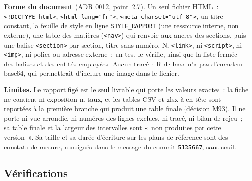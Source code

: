 \documentclass[a4paper,11pt]{article}
\newcommand{\code}[1]{\texttt{\small #1}}
\begin{document}
\medskip
\noindent
\textbf{Forme du document} (ADR 0012, point~2.7). Un seul fichier HTML~:
\code{<!DOCTYPE html>}, \code{<html lang="fr">},
\code{<meta charset="utf-8">}, un titre constant, la feuille de style en
ligne \code{STYLE\_RAPPORT} (une ressource interne, non externe), une table
des matières (\code{<nav>}) qui renvoie aux ancres des sections, puis une
balise \code{<section>} par section, titre sans numéro. Ni \code{<link>}, ni
\code{<script>}, ni \code{<img>}, ni police ou adresse externe~: un test le
vérifie, ainsi que la liste fermée des balises et des entités employées.
Aucun tracé~: R de base n'a pas d'encodeur base64, qui permettrait
d'inclure une image dans le fichier.

\medskip
\noindent
\textbf{Limites.} Le rapport figé est le seul livrable qui porte les valeurs
exactes~: la fiche ne contient ni exposition ni taux, et les tables CSV et
xlsx à en-tête sont reportées à la première branche qui produit une table
finale (décision M93). Il ne porte ni vue arrondie, ni numéros des lignes
exclues, ni tracé, ni bilan de rejeu~; sa table finale et la largeur des
intervalles sont «~non produites par cette version~». Sa
taille et sa durée d'écriture sur les plans de référence sont des constats
de mesure, consignés dans le message du commit \code{5135667}, sans seuil.\par
\endgroup

\subsection{Vérifications}
\label{sec:verifications-rapport}
\end{document}
